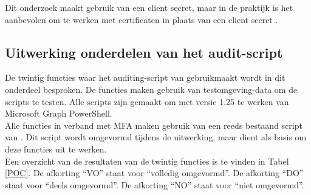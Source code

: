 Dit onderzoek maakt gebruik van een client secret, maar in de praktijk is het aanbevolen om te werken met certificaten in plaats van een client secret \autocite{Terlisten2022}.

\subsection{Uitwerking onderdelen van het audit-script}

De twintig functies waar het auditing-script van gebruikmaakt wordt in dit onderdeel besproken. De functies maken gebruik van testomgeving-data om de scripts te testen. Alle scripts zijn gemaakt om met versie 1.25 te werken van Microsoft Graph PowerShell. \\

Alle functies in verband met \ac{MFA} maken gebruik van een reeds bestaand script van \textcite{Allen2023}. Dit script wordt omgevormd tijdens de uitwerking, maar dient als basis om deze functies uit te werken. \\

Een overzicht van de resultaten van de twintig functies is te vinden in Tabel \ref{POC}. De afkorting “VO” staat voor “volledig omgevormd”. De afkorting “DO” staat voor “deels omgevormd”. De afkorting “NO” staat voor “niet omgevormd”. 

